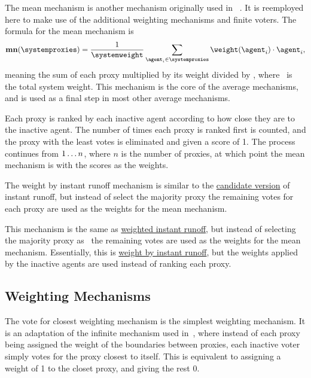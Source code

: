 The mean mechanism is another mechanism originally used in
~\cite{Cohensius2017}.
It is reemployed here to make use of the additional weighting mechanisms and
finite voters.
The formula for the mean mechanism is
\begin{equation*}
    \mathbf{mn}(\systemproxies) =
    \frac{1}{\systemweight}
    \sum_{\agent_i \in \systemproxies} {\weightof{\agent_i} \cdot \agent_i}
    \text{,}\label{eq:mean-mechanism}
\end{equation*}
meaning the sum of each proxy multiplied by its weight divided by
\systemweight, where \systemweight\ is the total system weight.
This mechanism is the core of the average mechanisms, and is used as a final
step in most other average mechanisms.

Each proxy is ranked by each inactive agent according to how close they are
to the inactive agent.
The number of times each proxy is ranked first is counted, and the proxy with
the least votes is eliminated and given a score of 1.
The process continues from $1 \mathellipsis n$, where $n$ is the number of proxies,
at which point the mean mechanism is with the scores as the weights.

\label{para:avg-instant-runoff}
The weight by instant runoff mechanism is similar to the
\hyperref[para:candidate-instant-runoff]{candidate version} of instant
runoff, but instead of select the majority proxy the remaining votes for
each proxy are used as the weights for the mean mechanism.

This mechanism is the same as
\hyperref[para:candidate-weighted-instant-runoff]{weighted instant runoff},
but instead of selecting the majority proxy as \systemtruth\ the remaining votes
are used as the weights for the mean mechanism.
Essentially, this is
\hyperref[para:avg-instant-runoff]{weight by instant runoff}, but the weights
applied by the inactive agents are used instead of ranking each proxy.


\subsection{Weighting Mechanisms}\label{subsec:weighting-mechanisms}

The vote for closest weighting mechanism is the simplest weighting mechanism.
It is an adaptation of the infinite mechanism used in~\cite{Cohensius2017},
where instead of each proxy being assigned the weight of the boundaries
between proxies, each inactive voter simply votes for the proxy closest to
itself.
This is equivalent to assigning a weight of 1 to the closet proxy, and giving
the rest 0.

